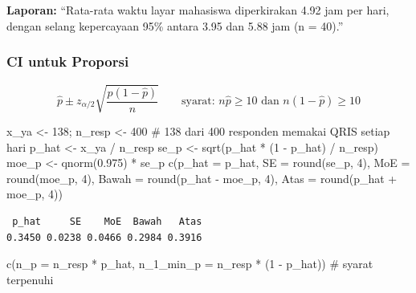 \documentclass[
  indonesian,
  letterpaper,
]{book}
\newenvironment{Shaded}{\begin{snugshade}}{\end{snugshade}}
\newcommand{\AttributeTok}[1]{\textcolor[rgb]{0.40,0.45,0.13}{#1}}
\newcommand{\CommentTok}[1]{\textcolor[rgb]{0.37,0.37,0.37}{#1}}
\newcommand{\DecValTok}[1]{\textcolor[rgb]{0.68,0.00,0.00}{#1}}
\newcommand{\FloatTok}[1]{\textcolor[rgb]{0.68,0.00,0.00}{#1}}
\newcommand{\FunctionTok}[1]{\textcolor[rgb]{0.28,0.35,0.67}{#1}}
\newcommand{\NormalTok}[1]{\textcolor[rgb]{0.00,0.23,0.31}{#1}}
\newcommand{\OtherTok}[1]{\textcolor[rgb]{0.00,0.23,0.31}{#1}}
\newcommand{\SpecialCharTok}[1]{\textcolor[rgb]{0.37,0.37,0.37}{#1}}
\begin{document}
\textbf{Laporan:} ``Rata-rata waktu layar mahasiswa diperkirakan 4.92
jam per hari, dengan selang kepercayaan 95\% antara 3.95 dan 5.88 jam (n
= 40).''

\subsubsection{CI untuk Proporsi}\label{ci-untuk-proporsi}

\[
\hat{p} \pm z_{\alpha/2}\sqrt{\frac{\hat{p}(1-\hat{p})}{n}}
\qquad \text{syarat: } n\hat{p} \geq 10 \text{ dan } n(1-\hat{p}) \geq 10
\]

\begin{Shaded}
\begin{Highlighting}[]
\NormalTok{x\_ya }\OtherTok{\textless{}{-}} \DecValTok{138}\NormalTok{; n\_resp }\OtherTok{\textless{}{-}} \DecValTok{400}       \CommentTok{\# 138 dari 400 responden memakai QRIS setiap hari}
\NormalTok{p\_hat }\OtherTok{\textless{}{-}}\NormalTok{ x\_ya }\SpecialCharTok{/}\NormalTok{ n\_resp}
\NormalTok{se\_p  }\OtherTok{\textless{}{-}} \FunctionTok{sqrt}\NormalTok{(p\_hat }\SpecialCharTok{*}\NormalTok{ (}\DecValTok{1} \SpecialCharTok{{-}}\NormalTok{ p\_hat) }\SpecialCharTok{/}\NormalTok{ n\_resp)}
\NormalTok{moe\_p }\OtherTok{\textless{}{-}} \FunctionTok{qnorm}\NormalTok{(}\FloatTok{0.975}\NormalTok{) }\SpecialCharTok{*}\NormalTok{ se\_p}
\FunctionTok{c}\NormalTok{(}\AttributeTok{p\_hat =}\NormalTok{ p\_hat, }\AttributeTok{SE =} \FunctionTok{round}\NormalTok{(se\_p, }\DecValTok{4}\NormalTok{), }\AttributeTok{MoE =} \FunctionTok{round}\NormalTok{(moe\_p, }\DecValTok{4}\NormalTok{),}
  \AttributeTok{Bawah =} \FunctionTok{round}\NormalTok{(p\_hat }\SpecialCharTok{{-}}\NormalTok{ moe\_p, }\DecValTok{4}\NormalTok{), }\AttributeTok{Atas =} \FunctionTok{round}\NormalTok{(p\_hat }\SpecialCharTok{+}\NormalTok{ moe\_p, }\DecValTok{4}\NormalTok{))}
\end{Highlighting}
\end{Shaded}

\begin{verbatim}
 p_hat     SE    MoE  Bawah   Atas 
0.3450 0.0238 0.0466 0.2984 0.3916 
\end{verbatim}

\begin{Shaded}
\begin{Highlighting}[]
\FunctionTok{c}\NormalTok{(}\AttributeTok{n\_p =}\NormalTok{ n\_resp }\SpecialCharTok{*}\NormalTok{ p\_hat, }\AttributeTok{n\_1\_min\_p =}\NormalTok{ n\_resp }\SpecialCharTok{*}\NormalTok{ (}\DecValTok{1} \SpecialCharTok{{-}}\NormalTok{ p\_hat))   }\CommentTok{\# syarat terpenuhi}
\end{Highlighting}
\end{Shaded}
\end{document}
